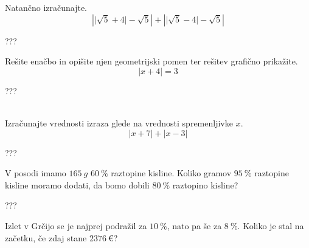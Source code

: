 \documentclass[addpoints]{exam}
\begin{document}
\begin{questions}
     
     
     
         \newpage 
     
         
         \question[4]
         Natančno izračunajte.
         $$ \left\lvert \lvert\sqrt{5}+4\rvert-\sqrt{5}\right\rvert + \left\lvert \lvert\sqrt{5}-4\rvert-\sqrt{5}\right\rvert $$
         
         
         
         \begin{solution}[10cm]
             ???
         \end{solution}
     
     
     
     
         \question[5]
         Rešite enačbo in opišite njen geometrijski pomen ter rešitev grafično prikažite.
         $$  \left\lvert x+4\right\rvert=3 $$
         
         
         \begin{solution}[8cm]
             ???
         \end{solution}
     
     
         \newpage
     
     
         ~\\
     
     
     
         \question[5]
         Izračunajte vrednosti izraza glede na vrednosti spremenljivke $x$.
         $$\left\lvert x+7 \right\rvert + \left\lvert x-3 \right\rvert $$
         
         
         \begin{solution}[10cm]
             ???
         \end{solution}
     
     
     
         \question[4]
         V posodi imamo $165~g$ $60~\%$ raztopine kisline. Koliko gramov $95~\%$ raztopine kisline moramo dodati, da bomo dobili $80~\%$ raztopino kisline?
         
         
         \begin{solution}[7cm]
             ???
         \end{solution}
     
     
     
         \newpage
     
         \question[4]
         Izlet v Grčijo se je najprej podražil za $10~\%$, nato pa še za $8~\%$. 
         Koliko je stal na začetku, če zdaj stane $2376~€$?
         

\end{questions}
\end{document}

